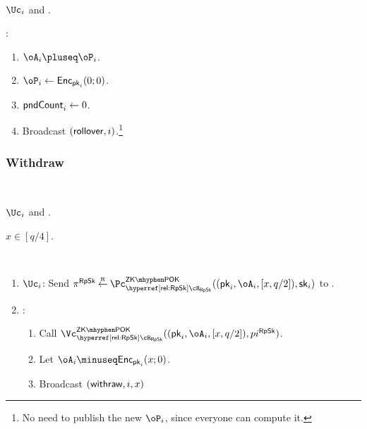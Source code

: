 \begin{protocol}~\label{prot:ConfidentialTransactions:Rollover}
	\item[Parties.] $\Uc_i$ and \Cc.
	
\item[Operation:] 
	\Cc:
	\begin{enumerate}
	
	
		
	\item $\oA_i  \pluseq \oP_i$.
	
	
	\item  $\oP_i \asn \Enc_{\pk_i}(0;0)$.
	
	\item  $\mathsf{pndCount}_i \leftarrow 0$.
	
	
	\item  Broadcast $(\mathsf{rollover},i)$.\footnote{No  need to publish  the new $\oP_i$, since everyone can compute it.}
	
	
\end{enumerate}
\end{protocol}


\subsubsection{Withdraw} 

\begin{protocol}~\label{prot:ConfidentialTransactions:Withdraw}
	\item[Parties:] $\Uc_i$ and \Cc.
	
	
	
	\item[Common input:]  $x\in[q/4]$.
	
	\item[Operation:]  ~
	
	\begin{enumerate}
		
		\item  $\Uc_i$:  Send $\pi^\RpSkS \getsr \pZKPOK{\rRpSk}((\pk_i,\oA_i,[x,q/2]),\sk_i)$ to \Cc.
	
	
	\item  \Cc: 
	\begin{enumerate}
		\item Call $\vZKPOK{\rRpSk}((\pk_i,\oA_i,[x,q/2]),pi^\RpSkS)$.
		
		\item Let $\oA_i \minuseq \Enc_{\pk_i}(x;0)$.
		
		\item Broadcast $(\mathsf{withraw},i,x)$
	\end{enumerate}
\end{enumerate}
\end{protocol}




